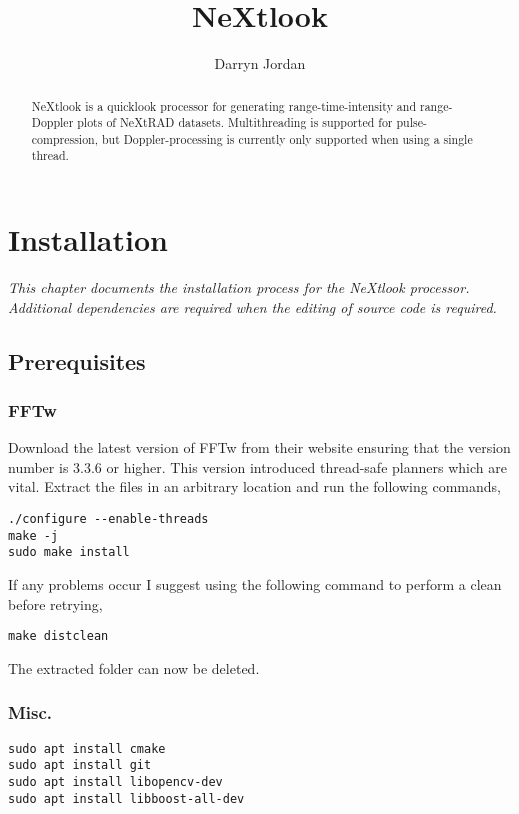 \documentclass[a4paper,11pt]{report}
\title{NeXtlook}
\author{Darryn Jordan}
\begin{document}
\maketitle
\tableofcontents

\begin{abstract}
NeXtlook is a quicklook processor for generating range-time-intensity and range-Doppler plots of NeXtRAD datasets. Multithreading is supported for pulse-compression, but Doppler-processing is currently only supported when using a single thread.
\end{abstract}

\chapter{Installation}
\textit{This chapter documents the installation process for the NeXtlook processor. Additional dependencies are required when the editing of source code is required.}
\section{Prerequisites}
\subsection{FFTw}
Download the latest version of FFTw from their website ensuring that the version number is 3.3.6 or higher. This version introduced thread-safe planners which are vital. 
Extract the files in an arbitrary location and run the following commands,
\begin{lstlisting}
./configure --enable-threads
make -j
sudo make install
\end{lstlisting}
If any problems occur I suggest using the following command to perform a clean before retrying,
\begin{lstlisting}
make distclean
\end{lstlisting}
The extracted folder can now be deleted.
\subsection{Misc.}
\begin{lstlisting}
sudo apt install cmake
sudo apt install git
sudo apt install libopencv-dev
sudo apt install libboost-all-dev
\end{lstlisting}
\end{document}
